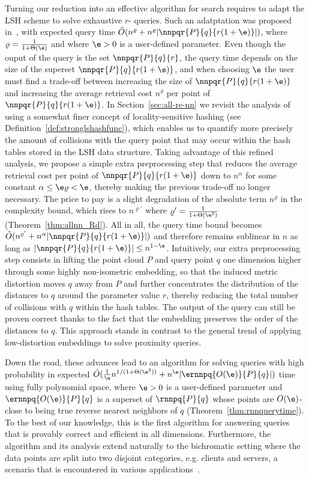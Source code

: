 Turning our reduction into an effective algorithm for \rnn search
requires to adapt the LSH scheme to solve exhaustive $r$-\pleb
queries. Such an adatptation was proposed in~\cite[Chapter~1]{SDI05},
with expected query time $\tilde O(n^{\varrho}
+n^\varrho|\nnpqr{P}{q}{r(1+\e)}|)$, where $\varrho =
\frac{1}{1+\Theta(\e)}$ and where $\e>0$ is a user-defined
parameter. Even though the ouput of the query is the set
$\nnpqr{P}{q}{r}$, the query time depends on the size of the superset
$\nnpqr{P}{q}{r(1+\e)}$, and when choosing $\e$ the user must find a
trade-off between increasing the size of $\nnpqr{P}{q}{r(1+\e)}$ and
increasing the average retrieval cost $n^\varrho$ per point of
$\nnpqr{P}{q}{r(1+\e)}$. In Section~\ref{sec:all-re-nn} we revisit the
analysis of~\cite[Chapter~1]{SDI05} using a somewhat finer concept of
locality-sensitive hashing (see
Definition~\ref{def:stronglshashfunc}), which enables us to quantify
more precisely the amount of collisions with the query point that may
occur within the hash tables stored in the LSH data structure. Taking
advantage of this refined analysis, we propose a simple extra
preprocessing step that reduces the average retrieval cost per point
of $\nnpqr{P}{q}{r(1+\e)}$ down to $n^\alpha$ for some constant
$\alpha\leq \e\varrho<\e$, thereby making the previous trade-off no
longer necessary. The price to pay is a slight degradation of the
absolute term $n^\varrho$ in the complexity bound, which rises to
$n^{\varrho'}$ where $\varrho'=\frac{1}{1+\Theta(\e^2)}$
(Theorem~\ref{thm:allnn_Rd}). All in all, the query time bound becomes
$\tilde O(n^{\varrho'} + n^\alpha|\nnpqr{P}{q}{r(1+\e)}|)$ and
therefore remains sublinear in $n$ as long as $|\nnpqr{P}{q}{r(1+\e)}|\leq
n^{1-\e}$.  Intuitively, our extra preprocessing step consists
in lifting the point cloud $P$ and query point $q$ one dimension
higher through some highly non-isometric embedding, so that the
induced metric distortion moves $q$ away from $P$ and further
concentrates the distribution of the distances to $q$ around the
parameter value $r$, thereby reducing the total number of collisions
with $q$ within the hash tables. The output of the query can still be
proven correct thanks to the fact that the embedding preserves the
order of the distances to $q$. This approach stands in contrast to the
general trend of applying low-distortion embeddings to solve proximity
queries.

Down the road, these advances lead to an algorithm for solving \rnn
queries with high probability in expected $\tilde
O(\frac{1}{\e}n^{1/(1+\Theta(\e^2))} + n^\e
|\ernnpq{O(\e)}{P}{q}|)$ time using fully polynomial space, where $\e>0$
is a user-defined parameter and $\ernnpq{O(\e)}{P}{q}$ is a superset
of $\rnnpq{P}{q}$ whose points are $O(\e)$-close to being true
reverse nearest neighbors of $q$ (Theorem~\ref{thm:rnnquerytime}). To
the best of our knowledge, this is the first algorithm for answering
\rnn queries that is provably correct and efficient in
all dimensions. Furthermore, the algorithm and its analysis extend
naturally to the bichromatic setting where the data points are split
into two disjoint categories, e.g. clients and servers, a scenario
that is encountered in various applications~\cite{KM00}.

